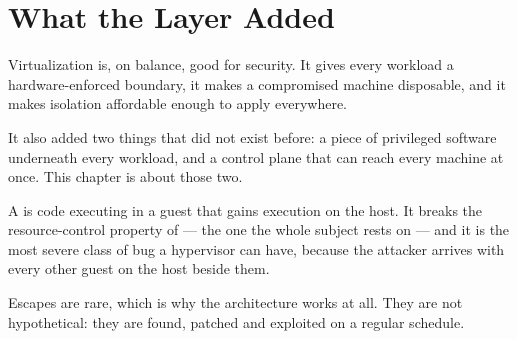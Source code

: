 \section{What the Layer Added}

Virtualization is, on balance, good for security. It gives every workload a
hardware-enforced boundary, it makes a compromised machine disposable, and it
makes isolation affordable enough to apply everywhere.

It also added two things that did not exist before: a piece of privileged
software underneath every workload, and a control plane that can reach every
machine at once. This chapter is about those two.

\begin{definitionbox}[VM Escape]
A  is code executing in a guest that gains execution on the
host. It breaks the resource-control property of  --- the one the
whole subject rests on --- and it is the most severe class of bug a hypervisor
can have, because the attacker arrives with every other guest on the host
beside them.

\smallskip
Escapes are rare, which is why the architecture works at all. They are not
hypothetical: they are found, patched and exploited on a regular schedule.
\end{definitionbox}

